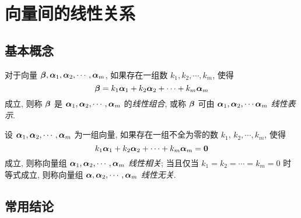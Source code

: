 \section{向量间的线性关系}

\subsection{基本概念}

\begin{definition}[线性表示]
    对于向量 $\vb*{\beta},\vb*{\alpha}_1,\vb*{\alpha}_2,\cdots,\vb*{\alpha}_m$, 如果存在一组数 $k_1,k_2,\cdots, k_m$, 使得
    $$\vb*{\beta}=k_{1} \vb*{\alpha}_{1}+k_{2} \vb*{\alpha}_{2}+\cdots+k_{m} \vb*{\alpha}_{m}$$
    成立, 则称 $ \vb*{\beta} $ 是 $ \vb*{\alpha}_{1}, \vb*{\alpha}_{2}, \cdots, \vb*{\alpha}_{m} $ 的\textit{线性组合}, 或称 $ \vb*{\beta} $ 可由 $ \vb*{\alpha}_{1}, \vb*{\alpha}_{2}, \cdots \vb*{\alpha}_{m} $ \textit{线性表示}.
\end{definition}

\begin{definition}[线性相关与线性无关]
    设 $ \vb*{\alpha}_{1}, \vb*{\alpha}_{2}, \cdots, \vb*{\alpha}_{m} $ 为一组向量, 如果存在一组不全为零的数 $ k_{1}$, $k_{2}, \cdots, k_{m} $, 使得
    $$k_{1} \vb*{\alpha}_{1}+k_{2} \vb*{\alpha}_{2}+\cdots+k_{m} \vb*{\alpha}_{m}=\mathbf{0}$$
    成立, 则称向量组 $ \vb*{\alpha}_{1}, \vb*{\alpha}_{2}, \cdots, \vb*{\alpha}_{m} $ \textit{线性相关}; 当且仅当  $k_{1}=k_{2}=\cdots=k_{m}=0 $ 时等式成立, 则称向量组 $ \vb*{\alpha}, \vb*{\alpha}_{2}, \cdots, \vb*{\alpha}_{m} $ \textit{线性无关}.
\end{definition}

\subsection{常用结论}

